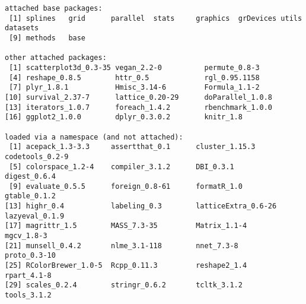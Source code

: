 \documentclass[9pt,english]{extarticle}\usepackage[]{graphicx}\usepackage[]{color}
\makeatletter
\newenvironment{kframe}{%
 \def\at@end@of@kframe{}%
 \ifinner\ifhmode%
  \def\at@end@of@kframe{\end{minipage}}%
  \begin{minipage}{\columnwidth}%
 \fi\fi%
 \def\FrameCommand##1{\hskip\@totalleftmargin \hskip-\fboxsep
 \colorbox{shadecolor}{##1}\hskip-\fboxsep
     \hskip-\linewidth \hskip-\@totalleftmargin \hskip\columnwidth}%
 \MakeFramed {\advance\hsize-\width
   \@totalleftmargin\z@ \linewidth\hsize
   \@setminipage}}%
 {\par\unskip\endMakeFramed%
 \at@end@of@kframe}
\newenvironment{knitrout}{}{} %
\makeatother
\begin{document}
\begin{linenumbers}
\begin{knitrout}
\begin{kframe}
\begin{verbatim}
attached base packages:
 [1] splines   grid      parallel  stats     graphics  grDevices utils     datasets 
 [9] methods   base     

other attached packages:
 [1] scatterplot3d_0.3-35 vegan_2.2-0          permute_0.8-3       
 [4] reshape_0.8.5        httr_0.5             rgl_0.95.1158       
 [7] plyr_1.8.1           Hmisc_3.14-6         Formula_1.1-2       
[10] survival_2.37-7      lattice_0.20-29      doParallel_1.0.8    
[13] iterators_1.0.7      foreach_1.4.2        rbenchmark_1.0.0    
[16] ggplot2_1.0.0        dplyr_0.3.0.2        knitr_1.8           

loaded via a namespace (and not attached):
 [1] acepack_1.3-3.3     assertthat_0.1      cluster_1.15.3      codetools_0.2-9    
 [5] colorspace_1.2-4    compiler_3.1.2      DBI_0.3.1           digest_0.6.4       
 [9] evaluate_0.5.5      foreign_0.8-61      formatR_1.0         gtable_0.1.2       
[13] highr_0.4           labeling_0.3        latticeExtra_0.6-26 lazyeval_0.1.9     
[17] magrittr_1.5        MASS_7.3-35         Matrix_1.1-4        mgcv_1.8-3         
[21] munsell_0.4.2       nlme_3.1-118        nnet_7.3-8          proto_0.3-10       
[25] RColorBrewer_1.0-5  Rcpp_0.11.3         reshape2_1.4        rpart_4.1-8        
[29] scales_0.2.4        stringr_0.6.2       tcltk_3.1.2         tools_3.1.2        
\end{verbatim}
\end{kframe}
\end{knitrout}


\end{linenumbers}
\end{document}
